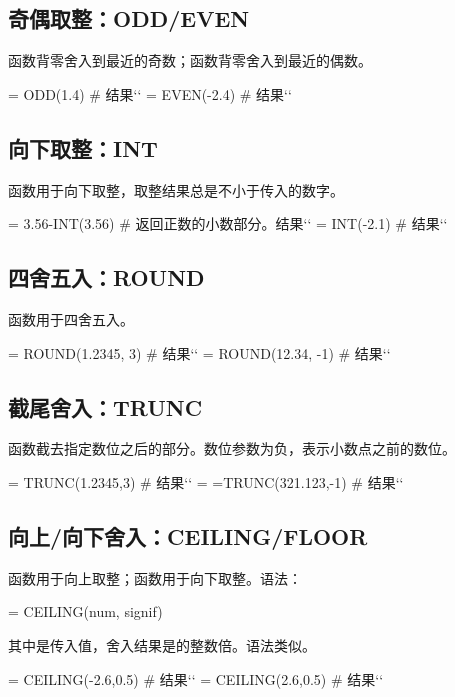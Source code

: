 \subsection{奇偶取整：ODD/EVEN}
函数背零舍入到最近的奇数；函数背零舍入到最近的偶数。
\begin{excode}
= ODD(1.4)  # 结果``
= EVEN(-2.4)  # 结果``
\end{excode}

\subsection{向下取整：INT}
函数用于向下取整，取整结果总是不小于传入的数字。
\begin{excode}
= 3.56-INT(3.56)  # 返回正数的小数部分。结果``
= INT(-2.1)  # 结果``
\end{excode}

\subsection{四舍五入：ROUND}
函数用于四舍五入。
\begin{excode}
= ROUND(1.2345, 3)  # 结果``
= ROUND(12.34, -1)  # 结果``
\end{excode}

\subsection{截尾舍入：TRUNC}
函数截去指定数位之后的部分。数位参数为负，表示小数点之前的数位。
\begin{excode}
= TRUNC(1.2345,3)  # 结果``
= =TRUNC(321.123,-1)  # 结果``
\end{excode}

\subsection{向上/向下舍入：CEILING/FLOOR}
函数用于向上取整；函数用于向下取整。语法：
\begin{syntax}
= CEILING(num, signif)
\end{syntax}

其中是传入值，舍入结果是的整数倍。语法类似。

\begin{excode}
= CEILING(-2.6,0.5)  # 结果``
= CEILING(2.6,0.5)  # 结果``
\end{excode}


